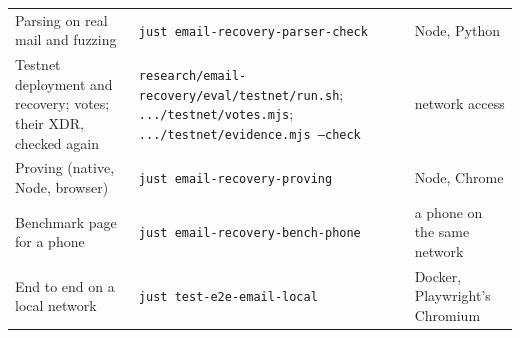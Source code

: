 \begin{table}[t]
\begin{tabularx}{\textwidth}{@{}>{\raggedright\arraybackslash}p{}>{\raggedright\arraybackslash}p{}>{\raggedright\arraybackslash}X@{}}
    Parsing on real mail and fuzzing & \texttt{just email-recovery-parser-check} & Node, Python \\
    Testnet deployment and recovery; votes; their XDR, checked again & \texttt{research/email-recovery/eval/testnet/run.sh}; \texttt{.../testnet/votes.mjs}; \texttt{.../testnet/evidence.mjs --check} & network access \\
    Proving (native, Node, browser) & \texttt{just email-recovery-proving} & Node, Chrome \\
    Benchmark page for a phone & \texttt{just email-recovery-bench-phone} & a phone on the same network \\
    End to end on a local network & \texttt{just test-e2e-email-local} & Docker, Playwright's Chromium \\
    \bottomrule
  \end{tabularx}
\end{table}
